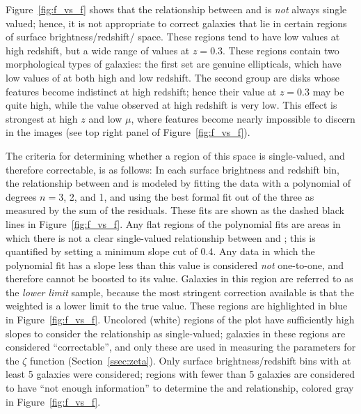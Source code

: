 \documentclass[twocolumn]{aastex6}
\begin{document}
Figure~\ref{fig:f_vs_f} shows that the relationship between \ffeaturesz{} and
\ffeaturesrest{} is \emph{not} always single valued; hence, it is not
appropriate to correct galaxies that lie in certain regions of surface
brightness/redshift/\ffeatures{} space. These regions tend to have low
\ffeatures{} values at high redshift, but a wide range of values at $z=0.3$.
These regions contain two morphological types of galaxies: the first set are
genuine ellipticals, which have low values of \ffeatures{} at both high and low
redshift. The second group are disks whose features become indistinct at high
redshift; hence their \ffeatures{} value at $z=0.3$ may be quite high, while
the value observed at high redshift is very low. This effect is strongest at
high $z$ and low $\mu$, where features become nearly impossible to discern in
the images (see top right panel of Figure~\ref{fig:f_vs_f}).

The criteria for determining whether a region of this space is single-valued,
and therefore correctable, is as follows: In each surface brightness and
redshift bin, the relationship between \ffeaturesz{} and \ffeaturesrest{} is
modeled by fitting the data with a polynomial of degrees $n=3$, 2, and 1, and
using the best formal fit out of the three as measured by the sum of the
residuals. These fits are shown as the dashed black lines in
Figure~\ref{fig:f_vs_f}. Any flat regions of the polynomial fits are areas in which
there is not a clear single-valued relationship between \ffeaturesz{} and
\ffeaturesrest; this is quantified by setting a minimum slope cut of 0.4. Any
data in which the polynomial fit has a slope less than this value is considered
\emph{not} one-to-one, and therefore \ffeaturesz{} cannot be boosted to its
\ffeaturesrest{} value.  Galaxies in this region are referred to as the
\emph{lower limit} sample, because the most stringent correction available is
that the weighted \ffeatures{} is a lower limit to the true value.  These
regions are highlighted in blue in Figure~\ref{fig:f_vs_f}. Uncolored (white)
regions of the plot have sufficiently high slopes to consider the relationship
as single-valued; galaxies in these regions are considered ``correctable'', and
only these are used in measuring the parameters for the $\zeta$ function
(Section~\ref{ssec:zeta}). Only surface brightness/redshift bins with at least
5 galaxies were considered; regions with fewer than 5 galaxies are considered
to have ``not enough information'' to determine the \ffeaturesz{} and
\ffeaturesrest{} relationship, colored gray in Figure~\ref{fig:f_vs_f}.
\end{document}
